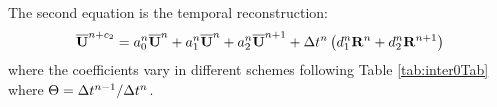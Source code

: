 \documentclass[preprint,12pt]{elsarticle}
\begin{document}
The second equation is the temporal reconstruction:
\begin{equation}
    \label{eq:TRSum}
    \overline{\mathbf{U}}^{n+c_2}  =
    a^n_0\overline{\mathbf{U}}^{n} +
    a^n_1\overline{\mathbf{U}}^{n} +
    a^n_2\overline{\mathbf{U}}^{n + 1}
    +
    \mathrm\Delta t^n
    \left(
    d^n_1\mathbf{R}^{n} +
    d^n_2\mathbf{R}^{n + 1}
    \right)
\end{equation}
where the coefficients vary in different schemes
following Table \ref{tab:inter0Tab} where
$\Theta = \mathrm\Delta t^{n-1} / \mathrm\Delta t^{n}$.
\end{document}
